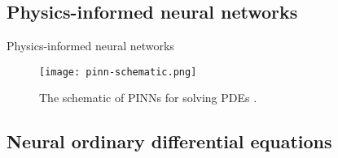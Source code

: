\subsection{Physics-informed neural networks}

\begin{frame}{Physics-informed neural networks}
    \begin{figure}[h]
        \centering
        \texttt{[image: pinn-schematic.png]}
        \caption{The schematic of \glspl{PINN} for solving \glspl{PDE} \cite{guoSolvingPartialDifferential2020}.}
        \label{fig:pinn-schematic}
    \end{figure}
\end{frame}

\subsection{Neural ordinary differential equations}

